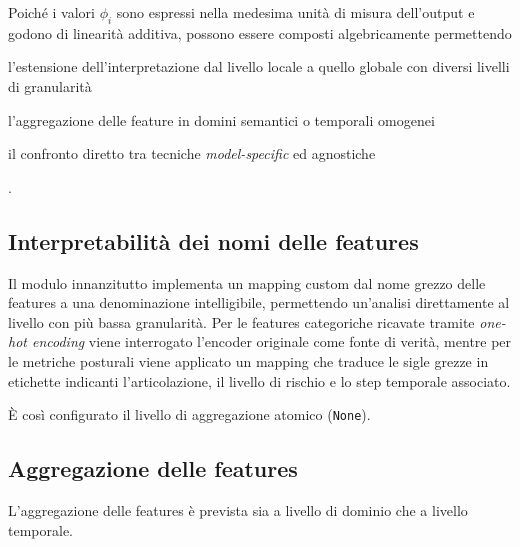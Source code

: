 Poiché i valori $\phi_i$ sono espressi nella medesima unità di misura dell'output e godono di linearità additiva, possono essere composti algebricamente permettendo
\begin{enumerate*}[label=(\roman*)]
    \item l'estensione dell'interpretazione dal livello locale a quello globale con diversi livelli di granularità
    \item l'aggregazione delle feature in domini semantici o temporali omogenei
    \item il confronto diretto tra tecniche \textit{model-specific} ed agnostiche
\end{enumerate*}.

\subsection{Interpretabilità dei nomi delle features}
\label{subsec:feature_naming}
Il modulo innanzitutto implementa un mapping custom dal nome grezzo delle features a una denominazione intelligibile, permettendo un'analisi direttamente al livello con più bassa granularità.
Per le features categoriche ricavate tramite \textit{one-hot encoding} viene interrogato l'encoder originale come fonte di verità, mentre per le metriche posturali viene applicato un mapping che traduce le sigle grezze in etichette indicanti l'articolazione, il livello di rischio e lo step temporale associato.

È così configurato il livello di aggregazione atomico (\texttt{None}).


\subsection{Aggregazione delle features}
\label{subsec:feature_aggregation}
L'aggregazione delle features è prevista sia a livello di dominio che a livello temporale.
